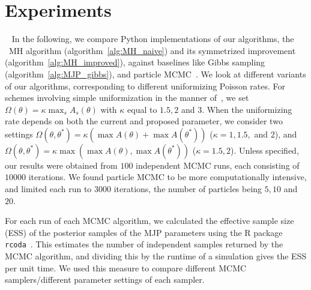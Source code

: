 
\section{Experiments}~
In the following, we compare Python implementations of our algorithms,
the \naive\ MH algorithm (algorithm~\ref{alg:MH_naive}) and its symmetrized
improvement (algorithm~\ref{alg:MH_improved}), against 
baselines like Gibbs sampling (algorithm~\ref{alg:MJP_gibbs}),
and particle MCMC~\cite{Andrieu10}. We look at different variants
of our algorithms, corresponding to different uniformizing Poisson rates.
For schemes involving simple uniformization in the manner of~\cite{RaoTeh13}, we set
 $\Omega(\theta) = \kappa \max_s A_s(\theta) $ with $\kappa$  equal to $1.5, 2$ 
 and $3$. When the uniformizing rate depends on both the current and proposed 
 parameter, we consider two settings
 $\Omega(\theta, \theta^*) = \kappa (\max A(\theta) + \max A(\theta^*))$ 
 ($\kappa = 1,1.5,$ and $2$), and 
$\Omega(\theta, \theta^*) = \kappa \max(\max A(\theta), \max A(\theta^*))$
($\kappa=1.5,2$). 
Unless specified, our results were
obtained from $100$ independent MCMC runs, each consisting of $10000$ iterations.
We found particle MCMC to be more computationally intensive, and limited each 
run to $3000$ iterations, the number of particles being $5, 10$ and $20$. 


For each run of each MCMC algorithm, we calculated the effective sample size 
(ESS) of the posterior samples of the MJP parameters using the R package 
\texttt{rcoda}~\cite{Rcoda2006}. This estimates the number of independent 
samples returned by the MCMC algorithm, and dividing this by the runtime of a 
simulation gives the ESS per unit time. We used this measure to compare 
different MCMC samplers/different parameter settings of each sampler.

